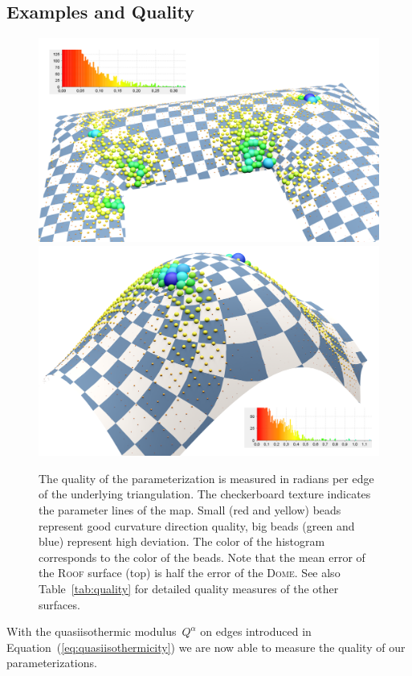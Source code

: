 \documentclass[twoside]{article}
\begin{document}
\subsection{Examples and Quality}
\label{sub:examples_quality}
\begin{figure}
\centering
\includegraphics[width=\linewidth]{../images/dach01_quality_highres.png}
\includegraphics[width=\linewidth]{../images/dach02_quality_highres.png}
\caption{The quality of the parameterization is measured in radians per
edge of the underlying triangulation. The checkerboard texture indicates the parameter
lines of the map. Small (red and yellow) beads represent good curvature direction quality, big
beads (green and blue) represent high deviation. The color of the histogram
corresponds to the color of the beads. Note that the mean error of the \textsc{Roof} 
surface (top) is half the error of the \textsc{Dome}. See also Table~\ref{tab:quality} 
for detailed quality measures of the other surfaces.}
\label{fig:quality}
\end{figure}
With the quasiisothermic modulus~$Q^\alpha$ on edges introduced in
Equation~(\ref{eq:quasiisothermicity}) we are now able to measure the 
quality of our parameterizations. 
\end{document}
